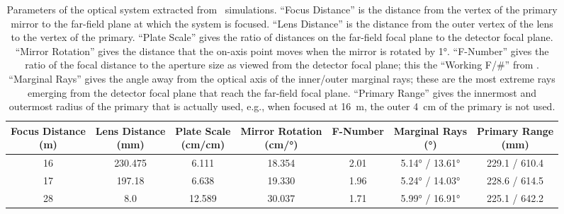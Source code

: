 \begin{table}
\centering
\caption[Parameters of the optical system extracted from \ZEMAX\ simulations]{
  Parameters of the optical system extracted from \ZEMAX\ simulations.
  ``Focus Distance'' is the distance from the vertex of the primary mirror to the far-field plane at which the system is focused.
  ``Lens Distance'' is the distance from the outer vertex of the lens to the vertex of the primary.
  ``Plate Scale'' gives the ratio of distances on the far-field focal plane to the detector focal plane.
  ``Mirror Rotation'' gives the distance that the on-axis point moves when the mirror is rotated by \ang{1}.
  ``F-Number'' gives the ratio of the focal distance to the aperture size as viewed from the detector focal plane; this the ``Working F/\#'' from \ZEMAX.
  ``Marginal Rays'' gives the angle away from the optical axis of the inner/outer marginal rays; these are the most extreme rays emerging from the detector focal plane that reach the far-field focal plane.
  ``Primary Range'' gives the innermost and outermost radius of the primary that is actually used, e.g., when focused at \SI{16}{\m}, the outer \SI{4}{\cm} of the primary is not used.
}
\label{tab:ch4-zemax-parms}
\begin{tabular}{ccccccc}
\toprule
  \specialcell{Focus Distance \\ (\si{\m})} &
  \specialcell{Lens Distance \\ (\si{\mm})} &
  \specialcell{Plate Scale \\ (\si{\cm}/\si{\cm})} &
  \specialcell{Mirror Rotation \\ (\si{\cm}/\si{\degree})} &
  \specialcell{F-Number  \\ } & 
  \specialcell{Marginal Rays \\ (\si{\degree})} &
  \specialcell{Primary Range \\ (\si{\mm})} \\
\midrule
16 & 230.475 &  6.111 & 18.354 & 2.01 &  \ang{5.14} / \ang{13.61} & 229.1 / 610.4 \\
17 & 197.18  &  6.638 & 19.330 & 1.96 &  \ang{5.24} / \ang{14.03} & 228.6 / 614.5 \\ 
28 &   8.0   & 12.589 & 30.037 & 1.71 &  \ang{5.99} / \ang{16.91} & 225.1 / 642.2 \\
\bottomrule
\end{tabular}
\end{table}

